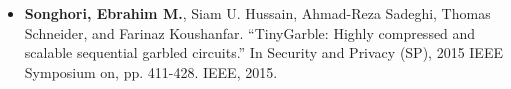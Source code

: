 \documentclass[overlapped]{res}
\begin{document}
\begin{resume}
\begin{itemize}
\item {\bf Songhori, Ebrahim M.}, Siam U. Hussain, Ahmad-Reza Sadeghi, Thomas Schneider, and Farinaz Koushanfar. ``TinyGarble: Highly compressed and scalable sequential garbled circuits.'' In Security and Privacy (SP), 2015 IEEE Symposium on, pp. 411-428. IEEE, 2015.

\end{itemize}
\end{resume}
\end{document}
